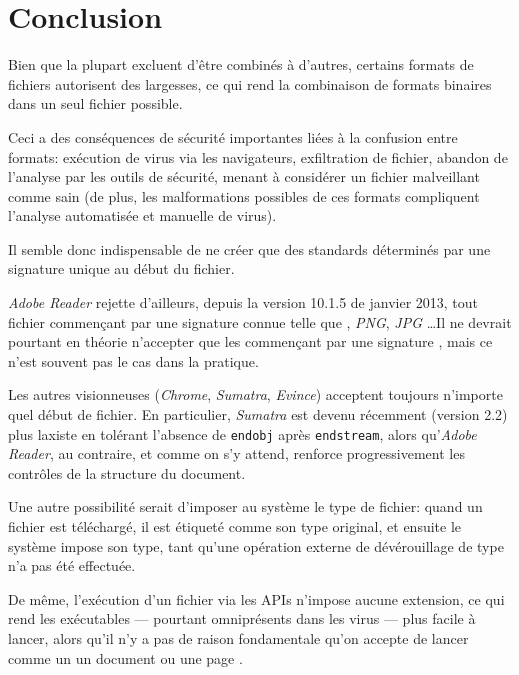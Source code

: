 \section{Conclusion}

Bien que la plupart excluent d'être combinés à d'autres, certains formats de fichiers autorisent des largesses, ce qui rend la combinaison de formats binaires dans un seul fichier possible.

Ceci a des conséquences de sécurité importantes liées à la confusion entre formats: exécution de virus via les navigateurs, exfiltration de fichier, abandon de l'analyse par les outils de sécurité, menant à considérer un fichier malveillant comme sain (de plus, les malformations possibles de ces formats compliquent l'analyse automatisée et manuelle de virus).

Il semble donc indispensable de ne créer que des standards déterminés par une signature unique au début du fichier.

\emph{Adobe Reader} rejette d'ailleurs, depuis la version 10.1.5 de janvier 2013, tout fichier \PDF commençant par une signature connue telle que \PE, \emph{PNG}, \emph{JPG} \ldots Il ne devrait pourtant en théorie n'accepter que les \PDF commençant par une signature \PDF, mais ce n'est souvent pas le cas dans la pratique.

Les autres visionneuses (\emph{Chrome}, \emph{Sumatra}, \emph{Evince}) acceptent toujours n'importe quel début de fichier. En particulier, \emph{Sumatra} est devenu récemment (version 2.2) plus laxiste en tolérant l'absence de \texttt{endobj} après \texttt{endstream}, alors qu'\emph{Adobe Reader}, au contraire, et comme on s'y attend, renforce progressivement les contrôles de la structure du document.

Une autre possibilité serait d'imposer au système le type de fichier: quand un fichier est téléchargé, il est étiqueté comme son type original, et ensuite le système impose son type, tant qu'une opération externe de dévérouillage de type n'a pas été effectuée.

De même, l'exécution d'un fichier via les APIs \WIN n'impose aucune extension, ce qui rend les exécutables --- pourtant omniprésents dans les virus --- plus facile à lancer, alors qu'il n'y a pas de raison fondamentale qu'on accepte de lancer comme un \PE un document \PDF ou une page \HTML.



